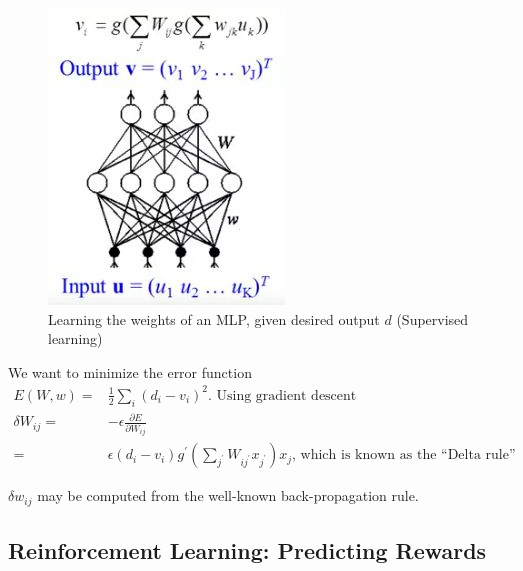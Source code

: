 \documentclass[]{article}
\begin{document}
\begin{figure}[H]
	\begin{center}
		\caption[Learning the weights of an MLP]{Learning the weights of an MLP, given desired output $d$ (Supervised learning)}
		\includegraphics[width=\textwidth]{learn-mlp}
	\end{center}
\end{figure}
We want to minimize the error function
\begin{align*}
	E(W,w) =& \frac{1}{2}\sum_{i} (d_i-v_i)^2 \text{. Using gradient descent}\\
	\delta W_{ij} =& - \epsilon \frac{\partial E}{\partial W_{ij}}\\
	=&\epsilon (d_i-v_i)g^{\prime} (\sum_{j^{\prime}} W_{ij^{\prime}} x_{j^{\prime}}) x_j \text{, which is known as the ``Delta rule''}
\end{align*}

$\delta w_{ij}$ may be computed from the well-known back-propagation rule.

\subsection{Reinforcement Learning: Predicting Rewards}
\end{document}
